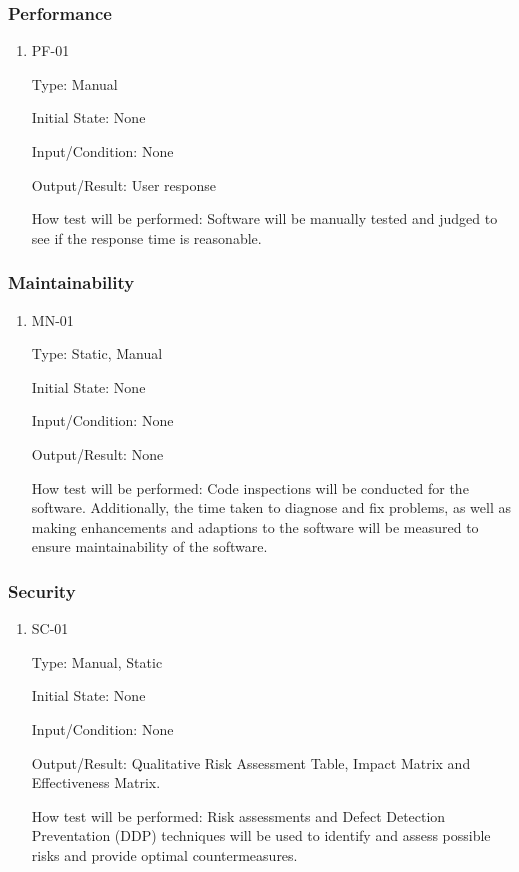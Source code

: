 \documentclass[12pt, titlepage]{article}
\begin{document}
\subsubsection{Performance}

\begin{enumerate}

\item{PF-01\\}

Type: Manual
					
Initial State: None
					
Input/Condition: None
					
Output/Result: User response
					
How test will be performed: 
Software will be manually tested and judged to see if the response time is reasonable. 

\end{enumerate}

\subsubsection{Maintainability}

\begin{enumerate}

\item{MN-01\\}

Type: Static, Manual
					
Initial State: None
					
Input/Condition: None
					
Output/Result: None
					
How test will be performed: Code inspections will be conducted for the software. Additionally, the time taken to diagnose and fix problems, as well as making enhancements and adaptions to the software will be measured to ensure maintainability of the software.

\end{enumerate}

\subsubsection{Security}

\begin{enumerate}

\item{SC-01\\}

Type: Manual, Static
					
Initial State: None
					
Input/Condition: None
					
Output/Result: Qualitative Risk Assessment Table, Impact Matrix and Effectiveness Matrix.
					
How test will be performed: Risk assessments and Defect Detection Preventation (DDP) techniques will be used to identify and assess possible risks and provide optimal countermeasures.

\end{enumerate}
\end{document}
